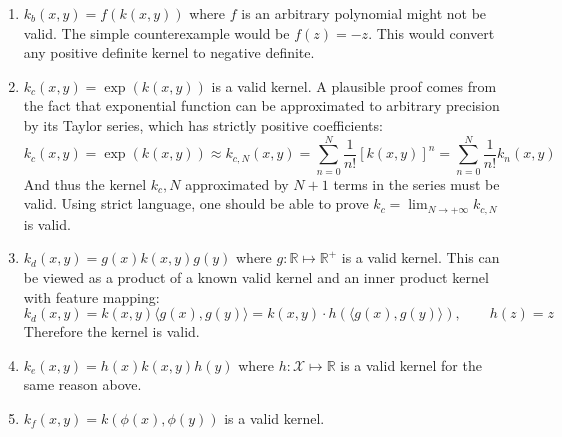 \documentclass[a4paper, 10pt]{article}
\begin{document}
\begin{enumerate}[label=(\alph*)]
\begin{enumerate}
        \item $k_b(x,y) = f(k(x,y))$ where $f$ is an arbitrary polynomial might not be valid. The simple counterexample would be $f(z) = -z$. This would convert any positive definite kernel to negative definite.
        
        \item $k_c(x,y) = \exp \left(k(x,y)\right)$ is a valid kernel. A plausible proof comes from the fact that exponential function can be approximated to arbitrary precision by its Taylor series, which has strictly positive coefficients:
        \begin{equation}
            k_c(x,y) = \exp\left(k(x,y)\right) \approx k_{c,N}(x,y) = \sum_{n=0}^N \frac{1}{n!}\left[k(x,y)\right]^n = \sum_{n=0}^N \frac{1}{n!} k_n(x,y)
        \end{equation}
        And thus the kernel $k_c,N$ approximated by $N+1$ terms in the series must be valid. Using strict language, one should be able to prove $k_c = \lim_{N\rightarrow +\infty} k_{c,N}$ is valid.
        
        \item $k_d(x,y) = g(x) k(x,y) g(y)$ where $g: \mathbb{R} \mapsto \mathbb{R}^+$ is a valid kernel. This can be viewed as a product of a known valid kernel and an inner product kernel with feature mapping:
        \begin{equation}
            k_d(x,y) = k(x,y) \langle g(x), g(y) \rangle = k(x,y) \cdot h(\langle g(x), g(y) \rangle),\qquad h(z) = z
        \end{equation}
        Therefore the kernel is valid.
        
        \item $k_e(x,y) = h(x) k(x,y) h(y)$ where $h: \mathcal{X} \mapsto \mathbb{R}$ is a valid kernel for the same reason above.
        \item $k_f(x,y) = k(\phi(x), \phi(y))$ is a valid kernel.
    \end{enumerate}
\end{enumerate}
\end{document}

